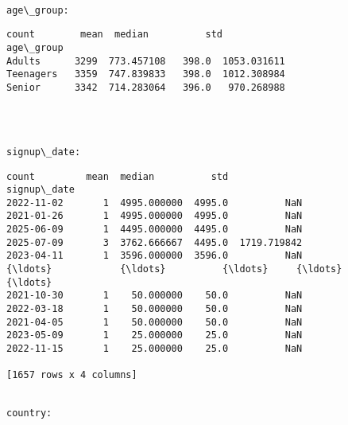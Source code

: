 \documentclass[11pt]{article}
\begin{document}
    \begin{Verbatim}[commandchars=\\\{\}]

age\_group:
    \end{Verbatim}

    
    \begin{Verbatim}[commandchars=\\\{\}]
           count        mean  median          std
age\_group                                        
Adults      3299  773.457108   398.0  1053.031611
Teenagers   3359  747.839833   398.0  1012.308984
Senior      3342  714.283064   396.0   970.268988
    \end{Verbatim}

    
    \begin{center}
    \end{center}
    { \hspace*{\fill} \\}
    
    \begin{Verbatim}[commandchars=\\\{\}]

signup\_date:
    \end{Verbatim}

    
    \begin{Verbatim}[commandchars=\\\{\}]
             count         mean  median          std
signup\_date                                         
2022-11-02       1  4995.000000  4995.0          NaN
2021-01-26       1  4995.000000  4995.0          NaN
2025-06-09       1  4495.000000  4495.0          NaN
2025-07-09       3  3762.666667  4495.0  1719.719842
2023-04-11       1  3596.000000  3596.0          NaN
{\ldots}            {\ldots}          {\ldots}     {\ldots}          {\ldots}
2021-10-30       1    50.000000    50.0          NaN
2022-03-18       1    50.000000    50.0          NaN
2021-04-05       1    50.000000    50.0          NaN
2023-05-09       1    25.000000    25.0          NaN
2022-11-15       1    25.000000    25.0          NaN

[1657 rows x 4 columns]
    \end{Verbatim}

    
    \begin{Verbatim}[commandchars=\\\{\}]

country:
    \end{Verbatim}
\end{document}
